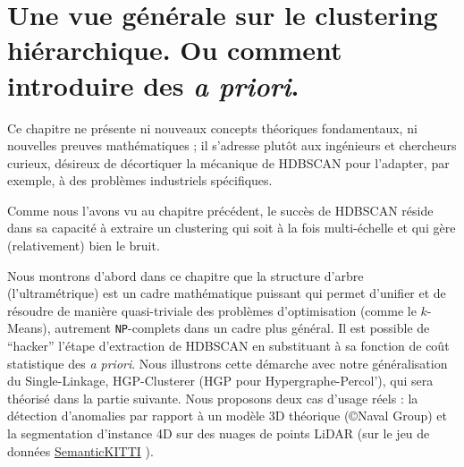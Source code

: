 
\chapter{Une vue générale sur le clustering hiérarchique. Ou comment introduire des \emph{a priori}. %
}
\label{chap:hacker_hdbscan}


Ce chapitre ne présente ni nouveaux concepts théoriques fondamentaux, ni nouvelles preuves mathématiques ; il s'adresse plutôt aux ingénieurs et chercheurs curieux, désireux de décortiquer la mécanique de HDBSCAN pour l'adapter, par exemple, à des problèmes industriels spécifiques.

Comme nous l'avons vu au chapitre précédent, le succès de HDBSCAN réside dans sa capacité à extraire un clustering qui soit à la fois multi-échelle et qui gère (relativement) bien le bruit.

Nous montrons d'abord dans ce chapitre que la structure d'arbre (l'ultramétrique) est un cadre mathématique puissant qui permet d'unifier et de résoudre de manière quasi-triviale des problèmes d'optimisation (comme le $k$-Means), autrement \texttt{NP}-complets dans un cadre plus général. 
Il est possible de ``hacker'' l'étape d'extraction de HDBSCAN en substituant à sa fonction de coût statistique des \emph{a priori}. 
Nous illustrons cette démarche avec notre généralisation du Single-Linkage, {HGP-Clusterer} (HGP pour Hypergraphe-Percol'), qui sera théorisé dans la partie suivante. Nous proposons deux cas d'usage réels : la détection d'anomalies par rapport à un modèle 3D théorique (\copyright Naval Group) et la segmentation d'instance 4D sur des nuages de points LiDAR (sur le jeu de données \href{https://semantic-kitti.org/}{SemanticKITTI} \cite{SemanticKITTI}).



